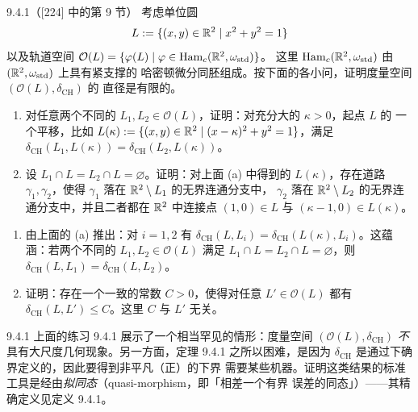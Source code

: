 \begin{wexer}{9.4.1}（[224] 中的第 9 节）
考虑单位圆
\[
  L:=\{(x,y)\in\mathbb{R}^2\mid x^2+y^2=1\}
\]
以及轨道空间 $\mathcal{O}(L)=\{\varphi(L)\mid\varphi\in\operatorname{Ham}_c(\mathbb{R}^2,\omega_{\mathrm{std}})\}$。
这里 $\operatorname{Ham}_c(\mathbb{R}^2,\omega_{\mathrm{std}})$ 由 $(\mathbb{R}^2,\omega_{\mathrm{std}})$ 上具有紧支撑的
哈密顿微分同胚组成。按下面的各小问，证明度量空间 $(\mathcal{O}(L),\delta_{\mathrm{CH}})$ 的
直径是有限的。
\begin{enumerate}[label=(\roman*)]
  \item 对任意两个不同的 $L_1,L_2\in\mathcal{O}(L)$，证明：对充分大的 $\kappa>0$，起点 $L$ 的
        一个平移，比如 $L(\kappa):=\{(x,y)\in\mathbb{R}^2\mid(x-\kappa)^2+y^2=1\}$，满足
        $\delta_{\mathrm{CH}}(L_1,L(\kappa))=\delta_{\mathrm{CH}}(L_2,L(\kappa))$。
  \item 设 $L_1\cap L=L_2\cap L=\varnothing$。证明：对上面 (a) 中得到的 $L(\kappa)$，存在道路
        $\gamma_1,\gamma_2$，使得 $\gamma_1$ 落在 $\mathbb{R}^2\setminus L_1$ 的无界连通分支中，
        $\gamma_2$ 落在 $\mathbb{R}^2\setminus L_2$ 的无界连通分支中，并且二者都在 $\mathbb{R}^2$ 中连接点
        $(1,0)\in L$ 与 $(\kappa-1,0)\in L(\kappa)$。
\end{enumerate}
\end{wexer}

\begin{enumerate}[label=(\roman*),start=3]
  \item 由上面的 (a) 推出：对 $i=1,2$ 有
        $\delta_{\mathrm{CH}}(L,L_i)=\delta_{\mathrm{CH}}(L(\kappa),L_i)$。这蕴涵：若两个不同的
        $L_1,L_2\in\mathcal{O}(L)$ 满足 $L_1\cap L=L_2\cap L=\varnothing$，则
        $\delta_{\mathrm{CH}}(L,L_1)=\delta_{\mathrm{CH}}(L,L_2)$。
  \item 证明：存在一个一致的常数 $C>0$，使得对任意 $L'\in\mathcal{O}(L)$ 都有
        $\delta_{\mathrm{CH}}(L,L')\le C$。这里 $C$ 与 $L'$ 无关。
\end{enumerate}

\begin{wrem}{9.4.1}
上面的练习 9.4.1 展示了一个相当罕见的情形：度量空间
$(\mathcal{O}(L),\delta_{\mathrm{CH}})$ \emph{不}具有大尺度几何现象。另一方面，定理 9.4.1
之所以困难，是因为 $\delta_{\mathrm{CH}}$ 是通过下确界定义的，因此要得到非平凡（正）的下界
需要某些机器。证明这类结果的标准工具是经由\emph{拟同态}（quasi-morphism，即「相差一个有界
误差的同态」）——其精确定义见定义 9.4.1。
\end{wrem}


